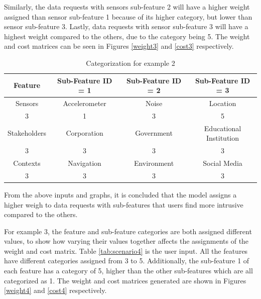 Similarly, the data requests with sensors sub-feature 2 will have a higher weight assigned than sensor sub-feature 1 because of its higher category, but lower than sensor sub-feature 3. Lastly, data requests with sensor sub-feature 3 will have a highest weight compared to the others, due to the category being 5. The weight and cost matrices can be seen in Figures \ref{weight3} and \ref{cost3} respectively.

\begin{table}[h!]
  \centering
  \caption{Categorization for example 2}
  \label{tab:scenario3}
  \begin{tabular}{cccc}
    \toprule
    Feature & Sub-Feature ID = 1 & Sub-Feature ID = 2 & Sub-Feature ID = 3\\
    \midrule
    Sensors & Accelerometer & Noise & Location\\
     3 & 1 & 3 & 5\\ \hhline{====}
     Stakeholders & Corporation & Government & Educational Institution\\
     3 & 3 & 3 & 3\\ \hhline{====}
     Contexts & Navigation & Environment & Social Media\\
     3 & 3 & 3 & 3\\ 
    \bottomrule
  \end{tabular}
\end{table}

% 


%


From the above inputs and graphs, it is concluded that the model assigns a higher weigh to data requests with sub-features that users find more intrusive compared to the others.

For example 3, the feature and sub-feature categories are both assigned different values, to show how varying their values together affects the assignments of the weight and cost matrix. Table \ref{tab:scenario4} is the user input. All the features have different categories assigned from 3 to 5. Additionally, the sub-feature 1 of each feature has a category of 5, higher than the other sub-features which are all categorized as 1. The weight and cost matrices generated are shown in Figures \ref{weight4} and \ref{cost4} respectively. 

